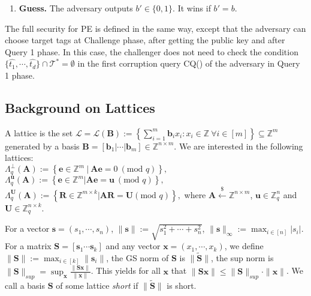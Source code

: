 \documentclass[runningheads,10pt]{llncs}
\def\ZZ{\mathbb{Z}}
\def\bf{\mathbf}
\def\calL{\mathcal{L}}
\def\e{\bf{e}}
\def\L{\Lambda}
\def\b{\bf{b}}
\def\s{\bf{s}}
\begin{document}
\begin{enumerate}
	\item \textbf{Guess.} The adversary outputs $b'\in \{0,1\}$. It wins if $b'=b$. 
\end{enumerate}
 The full security for PE is defined in the same way, 
except that the adversary can choose target tags at Challenge phase,  
after getting the public key and after Query 1 phase. 
In this case, the challenger does not need to check the condition $\{\widehat{t_1}, \cdots, \widehat{t_d}\} \cap \mathcal{T}^*= \emptyset$
in the first corruption query CQ() of the adversary in Query 1 phase. 

\subsection{Background on Lattices} \label{background}
A lattice is the set  $\calL=\calL(\textbf{B}):=\left\{\sum_{i=1}^m\b_ix_i : x_i\in\ZZ~\forall i\in[m ] \right\}\subseteq\ZZ^m$ 
generated by a basis $\textbf{B}=[\textbf{b}_1|\cdots |\textbf{b}_m]\in \ZZ^{n\times m}.$ 
We are interested in the following  lattices:\\
$	\Lambda^{\bot}_q(\textbf{A}) :=\left\{ \e\in\ZZ^m ~|~ \textbf{A}\e=0 ~(\text{mod } q) \right\}, $
	$\L_q^{\textbf{u}}(\textbf{A}) :=  \left\{ \e\in\ZZ^m| \textbf{A}\e=\textbf{u}~(\text{mod } q)  \right\},$\\
	$\L_q^{\textbf{U}}(\textbf{A}) :=  \left\{ \mathbf{R}\in\ZZ^{m\times k}| \textbf{A}\mathbf{R}=\textbf{U} (\text{mod } q)  \right\},$
where $\textbf{A}\xleftarrow{\$}\ZZ^{n\times m}$, $\textbf{u}\in\ZZ_q^n$ and $\textbf{U}\in\ZZ_q^{n \times k}$.  

For a vector $\textbf{s}=(s_1,\cdots, s_n)$, $\|\textbf{s}\|:=\sqrt{s_1^2+\cdots+s_n^2}$, $\|\textbf{s}\|_\infty:=\max_{i \in [n]}|s_i|$.  For a matrix $\textbf{S}=[\s_1\cdots\s_k]$ and any vector $\textbf{x}=(x_1,\cdots, x_k)$,   we define $\|\textbf{S}\|:=\max_{i\in [k]}\|\s_i\|$, the GS norm of $\textbf{S}$ is $\|\widetilde{\textbf{S}}\|$, the sup norm is $\| \mathbf{S}\|_{sup}=\sup_{\textbf{x}}\frac{\| \textbf{S} \textbf{x}\|}{\| \textbf{x}\|}$. This yields for all $\textbf{x}$ that $\| \textbf{S} \textbf{x}\| \leq \| \textbf{S}\|_{sup} \cdot \|\textbf{x}\|$.
We call a basis $\textbf{S}$  of some lattice \textit{short} if $\|\widetilde{\textbf{S}}\|$ is short. \\
\end{document}
